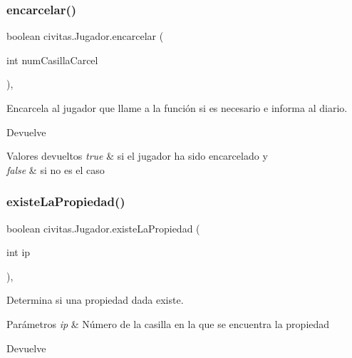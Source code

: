 \subsubsection{\texorpdfstring{encarcelar()}{encarcelar()}}
{\footnotesize\ttfamily boolean civitas.\+Jugador.\+encarcelar (\begin{DoxyParamCaption}\item[{int}]{num\+Casilla\+Carcel }\end{DoxyParamCaption})\hspace{0.3cm}{\ttfamily [inline]}, {\ttfamily [package]}}

Encarcela al jugador que llame a la función si es necesario e informa al diario. \begin{DoxyReturn}{Devuelve}

\end{DoxyReturn}

\begin{DoxyRetVals}{Valores devueltos}
{\em true} & si el jugador ha sido encarcelado y \\
\hline
{\em false} & si no es el caso \\
\hline
\end{DoxyRetVals}
\mbox{\label{classcivitas_1_1Jugador_a5ae51ea0cc7dd26a7db41fe6cd96dd87}} 
\subsubsection{\texorpdfstring{existe\+La\+Propiedad()}{existeLaPropiedad()}}
{\footnotesize\ttfamily boolean civitas.\+Jugador.\+existe\+La\+Propiedad (\begin{DoxyParamCaption}\item[{int}]{ip }\end{DoxyParamCaption})\hspace{0.3cm}{\ttfamily [inline]}, {\ttfamily [private]}}

Determina si una propiedad dada existe. 
\begin{DoxyParams}{Parámetros}
{\em ip} & Número de la casilla en la que se encuentra la propiedad \\
\hline
\end{DoxyParams}
\begin{DoxyReturn}{Devuelve}

\end{DoxyReturn}

